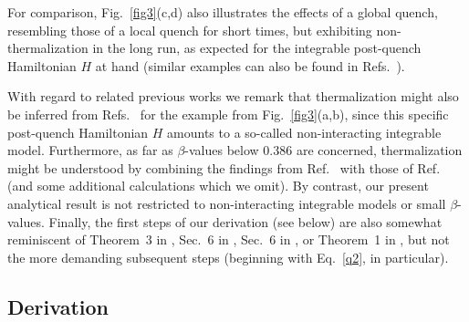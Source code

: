 \documentclass[twocolumn,aps,prb,floatfix,superscriptaddress]{revtex4-2}
\newcommand{\<}{\left\langle}	%
\renewcommand{\>}{\right\rangle}	%
\begin{document}
For comparison, Fig.~\ref{fig3}(c,d)
also illustrates the effects of a global quench, 
resembling those of a local quench for short times, 
but exhibiting non-thermalization in the long run, 
as expected for the integrable post-quench 
Hamiltonian $H$ at hand (similar examples can also be found in 
Refs.~\cite{rig14,rig16, mal18}).

With regard to related previous works
we remark that
thermalization might also be inferred from
Refs.~\cite{sot14,mur19,glu19}
for the example from Fig.~\ref{fig3}(a,b), 
since this specific post-quench 
Hamiltonian $H$ amounts to a so-called 
non-interacting integrable model.
Furthermore,
as far as $\beta$-values below $0.386$ are concerned, 
thermalization might be understood
by combining the findings from 
Ref.~\cite{far17} with those of Ref.~\cite{kli14}
(and some additional calculations which we omit).
By contrast, our present analytical result is not restricted to 
non-interacting integrable models
or small $\beta$-values.
Finally, the first steps of our derivation
(see below) are also somewhat  reminiscent of 
Theorem~3 in \cite{mul15}, %
Sec.~6 in \cite{mor16}, Sec.~6 in \cite{tas16}, or Theorem~1 in \cite{dun21}, 
but not the more demanding subsequent 
steps
(beginning with Eq.~\eqref{q2}, in particular).


\subsection{Derivation}
\label{sec:LocalQuenches:Derivation}
\end{document}
